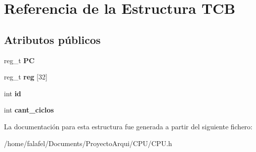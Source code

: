 \hypertarget{structTCB}{}\section{Referencia de la Estructura T\+CB}
\label{structTCB}
\subsection*{Atributos públicos}
\begin{DoxyCompactItemize}
\item 
\mbox{\label{structTCB_a9ce5ca7eec59ca2ad8b39118fb8b8958}} 
reg\+\_\+t {\bfseries PC}
\item 
\mbox{\label{structTCB_a913508ae57e5c39f1f87a730c60c8f98}} 
reg\+\_\+t {\bfseries reg} \mbox{[}32\mbox{]}
\item 
\mbox{\label{structTCB_a453409a559526647015e8ed1ed3da06a}} 
int {\bfseries id}
\item 
\mbox{\label{structTCB_aa225fc29592672bc30cb1702049532c4}} 
int {\bfseries cant\+\_\+ciclos}
\end{DoxyCompactItemize}


La documentación para esta estructura fue generada a partir del siguiente fichero\+:\begin{DoxyCompactItemize}
\item 
/home/falafel/\+Documents/\+Proyecto\+Arqui/\+C\+P\+U/C\+P\+U.\+h\end{DoxyCompactItemize}
